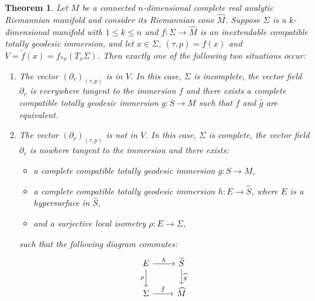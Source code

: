 \documentclass[11pt,a4paper,final]{amsart}
\renewcommand{\hat}{\widehat}
\renewcommand{\tilde}{\widetilde}
\newtheorem{theorem}{Theorem}[section]
\theoremstyle{definition}
\begin{document}
\begin{theorem}\label{th:TGSubmanifoldsOfCones}
	Let $M$ be a connected $n$-dimensional complete real analytic Riemannian manifold and consider its Riemannian cone $\hat{M}$.
	Suppose $\Sigma$ is a $k$-dimensional manifold with $1\leq k\leq n$ and $f\colon \Sigma\to \hat{M}$ is an inextendable compatible totally geodesic immersion, and let $x\in\Sigma$, $(\tau,p)=f(x)$ and $V=\tilde{f}(x)=f_{*x}(T_{x}\Sigma)$.
	Then exactly one of the following two situations occur:
	\begin{enumerate}[\rm (i)]
		\item\label{thItem:partialRIsTangent}  The vector $(\partial_{r})_{(\tau,p)}$ is in $V$.
		In this case, $\Sigma$ is incomplete, the vector field $\partial_{r}$ is everywhere tangent to the immersion $f$ and there exists a complete compatible totally geodesic immersion $g\colon S\to M$ such that $f$ and $\hat{g}$ are equivalent.
		\item\label{thItem:partialRIsNotTangent} The vector $(\partial_{r})_{(\tau,p)}$ is not in $V$.
		In this case, $\Sigma$ is complete, the vector field $\partial_{r}$ is nowhere tangent to the immersion and there exists:
		\begin{itemize}
			\item a complete compatible totally geodesic immersion $g\colon S\to M$,
			\item a complete compatible totally geodesic immersion $h\colon E\to \hat{S}$, where $E$ is a hypersurface in $\hat{S}$,
			\item and a surjective local isometry $\rho\colon E\to \Sigma$,
		\end{itemize}
		such that the following diagram commutes:
		\[
		\begin{tikzcd}
			E \arrow[d, "\rho"'] \arrow[r, "h"] & \hat{S} \arrow[d, "\hat{g}"] \\
			\Sigma \arrow[r, "f"]               & \hat{M}                     
		\end{tikzcd}
		\]
	\end{enumerate}
\end{theorem}
\end{document}
